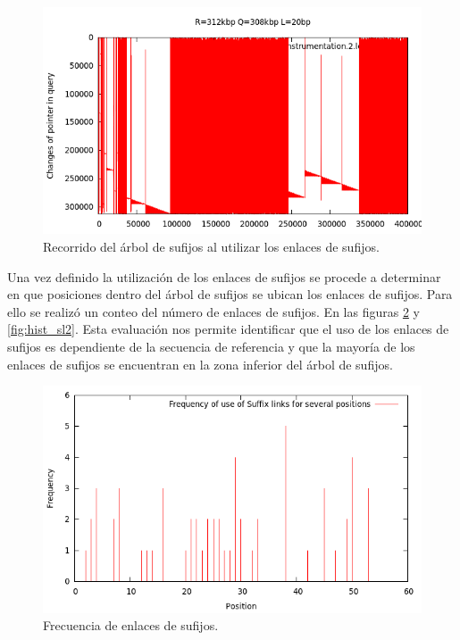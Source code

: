 \documentclass[12pt,a4paper]{article}
\begin{document}
\begin{figure}[h]
\begin{center}
\includegraphics[scale=0.4]{r312kbp-q308kbp-l20.png}
\caption{Recorrido del árbol de sufijos al utilizar los enlaces de sufijos.}
\label{fig:st_sl2}
\end{center}
\end{figure} 
Una vez definido la utilización de los enlaces de sufijos se procede a determinar en que posiciones dentro del árbol de sufijos
se ubican los enlaces de sufijos. Para ello se realizó un conteo del número de enlaces de sufijos. En las figuras \ref{fig:hist_sl}
y \ref{fig:hist_sl2}. Esta evaluación nos permite identificar que el uso de los enlaces de sufijos es dependiente de la secuencia
de referencia y que la mayoría de los enlaces de sufijos se encuentran en la zona inferior del árbol de sufijos.
\begin{figure}[h]
\begin{center}
\includegraphics[scale=0.4]{histogram2.png}
\caption{Frecuencia de enlaces de sufijos.}
\label{fig:hist_sl}
\end{center}
\end{figure}
\end{document}
